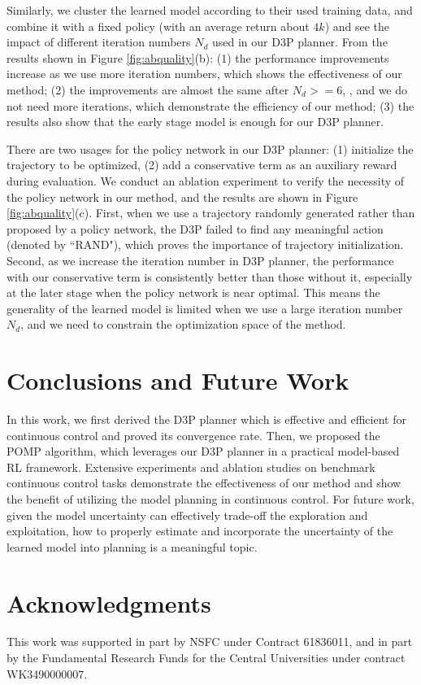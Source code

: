 \documentclass{article}
\begin{document}
 Similarly, we cluster the learned model according to their used training data, and combine it with a fixed policy (with an average return about $4k$) and see the impact of different iteration numbers $N_d$ used in our D3P planner. From the results shown in Figure \ref{fig:abquality}(b): (1) the performance improvements increase as we use more iteration numbers, which shows the effectiveness of our method; (2) the improvements are almost the same after  $N_d>=6$, ,  and we do not need more iterations, which demonstrate the efficiency of our method; (3) the results also show that the early stage model is enough for our D3P planner.

 There are two usages for the policy network in our D3P planner: (1) initialize the trajectory to be optimized, (2) add a conservative term as an auxiliary reward during evaluation. We conduct an ablation experiment to verify the necessity of the policy network in our method, and the results are shown in Figure \ref{fig:abquality}(c). First, when we use a trajectory randomly generated rather than proposed by a policy network, the D3P failed to find any meaningful action (denoted by ``RAND"), which proves the importance of trajectory initialization. Second, as we increase  the iteration number in D3P planner, the performance with our conservative term is consistently better than those without it, especially at the later stage when the policy network is near optimal. This means the generality of the learned model is limited when we use a large iteration number $N_d$, and we need to constrain the optimization space of the method.

\section{Conclusions and Future Work}

In this work, we first derived the D3P planner which is effective and efficient for continuous control  and proved its convergence rate. Then, we proposed the POMP algorithm, which leverages our D3P planner in a practical model-based RL framework. Extensive experiments and ablation studies on benchmark continuous control
tasks demonstrate the effectiveness of our method and show the benefit of utilizing the model planning in continuous control.
For future work,  given the model uncertainty can effectively trade-off the exploration and  exploitation, how to properly estimate and  incorporate the uncertainty of the learned model into planning is a meaningful topic.

\section*{Acknowledgments}
This work was supported in part by NSFC under Contract 61836011, and in part by the Fundamental Research Funds for the Central Universities under contract WK3490000007.




\newpage
\end{document}
